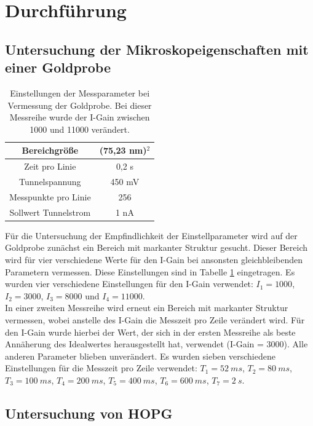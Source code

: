 \documentclass[12pt,a4paper]{article}
\begin{document}
\section{Durchführung}
\subsection{Untersuchung der Mikroskopeigenschaften mit einer Goldprobe}

\begin{table}
\centering
\begin{tabular}{|c|c|}
\hline 
Bereichgröße & (75,23 nm)$^2$ \\ 
\hline 
Zeit pro Linie & 0,2 s \\
\hline 
Tunnelspannung & 450 mV \\ 
\hline 
Messpunkte pro Linie & 256 \\
\hline 
Sollwert Tunnelstrom & 1 nA \\
\hline 
\end{tabular} 
\caption{Einstellungen der Messparameter bei Vermessung der Goldprobe. Bei dieser Messreihe wurde der I-Gain zwischen 1000 und 11000 verändert.}
\label{tab:IGain_Einstellungen}
\end{table}

Für die Untersuchung der Empfindlichkeit der Einstellparameter wird auf der Goldprobe zunächst ein Bereich mit markanter Struktur gesucht. Dieser Bereich wird für vier verschiedene Werte für den I-Gain bei ansonsten gleichbleibenden Parametern vermessen. Diese Einstellungen sind in Tabelle \ref{tab:IGain_Einstellungen} eingetragen. Es wurden vier verschiedene Einstellungen für den I-Gain verwendet: $I_1 = 1000$, $I_2 = 3000$, $I_3 = 8000$ und $I_4 = 11000$.\\
In einer zweiten Messreihe wird erneut ein Bereich mit markanter Struktur vermessen, wobei anstelle des I-Gain die Messzeit pro Zeile verändert wird. Für den I-Gain wurde hierbei der Wert, der sich in der ersten Messreihe als beste Annäherung des Idealwertes herausgestellt hat, verwendet (I-Gain = 3000). Alle anderen Parameter blieben unverändert. Es wurden sieben verschiedene Einstellungen für die Messzeit pro Zeile verwendet: $T_1 = \SI{52}{ms}$, $T_2 = \SI{80}{ms}$, $T_3 = \SI{100}{ms}$, $T_4 = \SI{200}{ms}$, $T_5 = \SI{400}{ms}$, $T_6 = \SI{600}{ms}$, $T_7 = \SI{2}{s}$.

\subsection{Untersuchung von HOPG}
\end{document}

